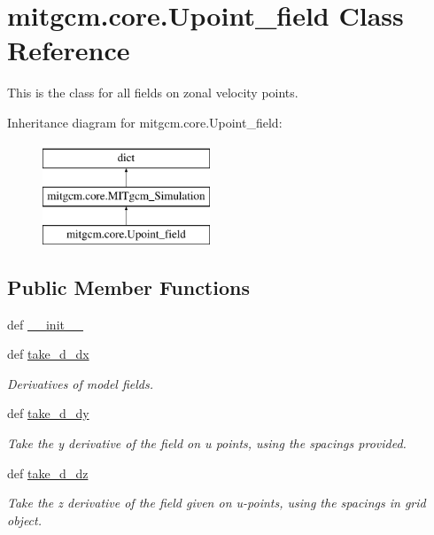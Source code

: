 \hypertarget{classmitgcm_1_1core_1_1Upoint__field}{}\section{mitgcm.\+core.\+Upoint\+\_\+field Class Reference}
\label{classmitgcm_1_1core_1_1Upoint__field}


This is the class for all fields on zonal velocity points.  


Inheritance diagram for mitgcm.\+core.\+Upoint\+\_\+field\+:\begin{figure}[H]
\begin{center}
\leavevmode
\includegraphics[height=3.000000cm]{classmitgcm_1_1core_1_1Upoint__field}
\end{center}
\end{figure}
\subsection*{Public Member Functions}
\begin{DoxyCompactItemize}
\item 
def \hyperlink{classmitgcm_1_1core_1_1Upoint__field_ab4adbcfd61c7b303b8499a5228cd6f77}{\+\_\+\+\_\+init\+\_\+\+\_\+}
\item 
def \hyperlink{classmitgcm_1_1core_1_1Upoint__field_a40c4ea3c2527688e8419c0a276e27d5c}{take\+\_\+d\+\_\+dx}
\begin{DoxyCompactList}\small\item\em Derivatives of model fields. \end{DoxyCompactList}\item 
def \hyperlink{classmitgcm_1_1core_1_1Upoint__field_acac1cef0245cd27c0975a84bef22a71d}{take\+\_\+d\+\_\+dy}
\begin{DoxyCompactList}\small\item\em Take the y derivative of the field on u points, using the spacings provided. \end{DoxyCompactList}\item 
def \hyperlink{classmitgcm_1_1core_1_1Upoint__field_acbc550b512401054ac04eca3dc7318af}{take\+\_\+d\+\_\+dz}
\begin{DoxyCompactList}\small\item\em Take the z derivative of the field given on u-\/points, using the spacings in grid object. \end{DoxyCompactList}\end{DoxyCompactItemize}
